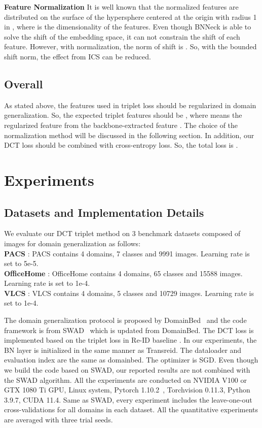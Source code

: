 \documentclass[a4paper,fleqn]{cas-dc}
\begin{document}
\noindent\textbf{Feature Normalization} It is well known that the normalized features are distributed on the surface of the hypersphere centered at the origin  with radius 1 in , where  is the dimensionality of the features. Even though  BNNeck is able to solve the shift of the embedding space, it can not constrain the shift of each feature. However, with normalization, the norm of shift is . So, with the bounded shift norm, the effect from ICS can be reduced. 
\subsection{Overall}
As stated above, the features used in triplet loss should be regularized in domain generalization. So, the expected triplet features should be , where  means the regularized feature from the backbone-extracted feature . The choice of the normalization method will be discussed in the following section. In addition, our DCT loss should be combined with cross-entropy loss. So, the total loss is .  \section{Experiments}
\label{sec: Experiment}

\subsection{Datasets and Implementation Details}
We evaluate our DCT triplet method on 3 benchmark datasets composed of images for domain generalization as follows:\\
\textbf{PACS} \cite{PACS}: PACS contains 4 domains, 7 classes and 9991 images. Learning rate is set to 5e-5.\\
\textbf{OfficeHome} \cite{officehome}: OfficeHome contains 4 domains, 65 classes and 15588 images. Learning rate is set to 1e-4.\\
\textbf{VLCS} \cite{VLCS}: VLCS contains 4 domains, 5 classes and 10729 images. Learning rate is set to 1e-4.\par
The domain generalization protocol is proposed by DomainBed~\cite{domainbed} and the code framework is from SWAD~\cite{swad} which is updated from DomainBed. The DCT loss is implemented based on the triplet loss in Re-ID baseline \cite{reidsb,transreid}. In our experiments, the BN layer is initialized in the same manner as Transreid\cite{transreid}. The dataloader and evaluation index are the same as domainbed. The optimizer is SGD. Even though we build the code based on SWAD, our reported results are not combined with the SWAD algorithm. All the experiments are conducted on NVIDIA V100 or GTX 1080 Ti GPU, Linux system, Pytorch 1.10.2~\cite{pytorch}, Torchvision 0.11.3, Python 3.9.7, CUDA 11.4. Same as  SWAD, every experiment includes the leave-one-out cross-validations for all domains in each dataset. All the quantitative experiments are averaged with three trial seeds. 
\end{document}
